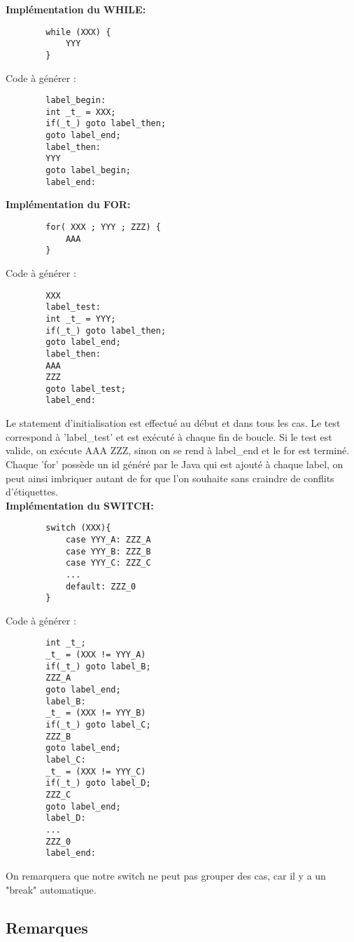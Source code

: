 \documentclass[12pt, a4paper]{article}
\begin{document}
\textbf{Implémentation du WHILE:}
\begin{codequote}
    \begin{verbatim}
        while (XXX) {
            YYY
        }
    \end{verbatim}
\end{codequote}
Code à générer :
\begin{codequote}
    \begin{verbatim}
        label_begin:
        int _t_ = XXX;
        if(_t_) goto label_then;
        goto label_end;
        label_then:
        YYY
        goto label_begin;
        label_end:
    \end{verbatim}
\end{codequote}


\textbf{Implémentation du FOR:}
\begin{codequote}
    \begin{verbatim}
        for( XXX ; YYY ; ZZZ) {
            AAA
        }
    \end{verbatim}
\end{codequote}
Code à générer :
\begin{codequote}
    \begin{verbatim}
        XXX
        label_test:
        int _t_ = YYY;
        if(_t_) goto label_then;
        goto label_end;
        label_then:
        AAA
        ZZZ
        goto label_test;
        label_end:
    \end{verbatim}
\end{codequote}
Le statement d'initialisation est effectué au début et dans tous les cas. Le test correspond à 'label_test' et est exécuté à chaque fin de boucle. Si le test est valide, on exécute AAA ZZZ, sinon on se rend à label\_end et le for est terminé. Chaque 'for' possède un id généré par le Java qui est ajouté à chaque label, on peut ainsi imbriquer autant de for que l'on souhaite sans craindre de conflits d'étiquettes.\\

\textbf{Implémentation du SWITCH:}
\begin{codequote}
    \begin{verbatim}
        switch (XXX){
            case YYY_A: ZZZ_A
            case YYY_B: ZZZ_B
            case YYY_C: ZZZ_C
            ...
            default: ZZZ_0 
        }
    \end{verbatim}
\end{codequote}
Code à générer :
\begin{codequote}
    \begin{verbatim}
        int _t_;
        _t_ = (XXX != YYY_A)
        if(_t_) goto label_B;
        ZZZ_A
        goto label_end;
        label_B:
        _t_ = (XXX != YYY_B)
        if(_t_) goto label_C;
        ZZZ_B
        goto label_end;
        label_C:
        _t_ = (XXX != YYY_C)
        if(_t_) goto label_D;
        ZZZ_C
        goto label_end;
        label_D:
        ...
        ZZZ_0
        label_end:
    \end{verbatim}
\end{codequote}
On remarquera que notre switch ne peut pas grouper des cas, car il y a un "break" automatique.

\subsection*{Remarques}
\end{document}
